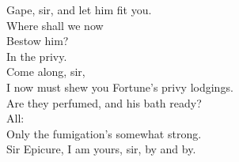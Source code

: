 \documentclass[a4paper,oneside]{memoir}
\begin{document}
\begin{drama*}
Gape, sir, and let him fit you.\\
\subtlespeaks {} Where shall we now\\
Bestow him?\\
\dolspeaks {} In the privy.\\
\subtlespeaks {} Come along, sir,\\
I now must shew you Fortune's privy lodgings.\\
\facespeaks Are they perfumed, and his bath ready?\\
\subtlespeaks {} All:\\
Only the fumigation's somewhat strong.\\
\facespeaks {}
Sir Epicure, I am yours, sir, by and by.\\
\act

\scene


\end{drama*}
\end{document}
